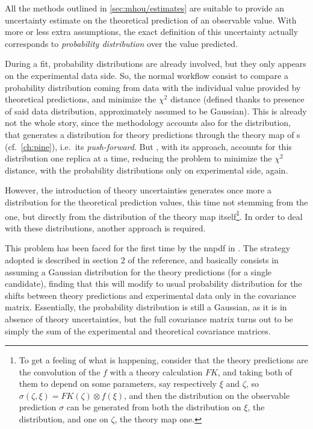
All the methods outlined in \cref{sec:mhou/estimates} are suitable to provide
an uncertainty estimate on the theoretical prediction of an observable value.
With more or less extra assumptions, the exact definition of this uncertainty
actually corresponds to \textit{probability distribution} over the value
predicted.

During a \pdf fit, probability distributions are already involved, but they
only appears on the experimental data side.
So, the normal workflow consist to compare a probability distribution coming
from data with the individual value provided by theoretical predictions, and
minimize the $\chi^2$ distance (defined thanks to presence of said data
distribution, approximately assumed to be Gaussian).
%
This is already not the whole story, since the \nnpdf methodology accounts also
for the \pdf distribution, that generates a distribution for theory predictions
through the theory map of \fktab{}s (cf.\ \cref{ch:pine}), i.e.\ its
\textit{push-forward}.
%
But \nnpdf, with its \mc approach, accounts for this distribution one \pdf
replica at a time, reducing the problem to minimize the $\chi^2$ distance, with
the probability distributions only on experimental side, again.

However, the introduction of theory uncertainties generates once more a
distribution for the theoretical prediction values, this time not stemming from
the \pdf one, but directly from the distribution of the theory map itself\footnote{
  To get a feeling of what is happening, consider that the theory predictions
  are the convolution of the \pdf $f$ with a theory calculation $FK$, and
  taking both of them to depend on some parameters, say respectively $\xi$ and
  $\zeta$, so $\sigma(\zeta, \xi) = FK(\zeta) \otimes f(\xi)$, and then the
  distribution on the observable prediction $\sigma$ can be generated from both
  the distribution on $\xi$, the \pdf distribution, and one on $\zeta$, the
  theory map one.
}.
%
In order to deal with these distributions, another approach is required.

This problem has been faced for the first time by the \acrlong{nnpdf} in
\cite{NNPDF:2019ubu}.
%
The strategy adopted is described in section 2 of the reference, and basically
consists in assuming a Gaussian distribution for the theory predictions (for a
single \pdf candidate), finding that this will modify to usual probability
distribution for the shifts between theory predictions and experimental data
only in the covariance matrix.
%
Essentially, the probability distribution is still a Gaussian, as it is in
absence of theory uncertainties, but the full covariance matrix turns out to be
simply the sum of the experimental and theoretical covariance matrices.


